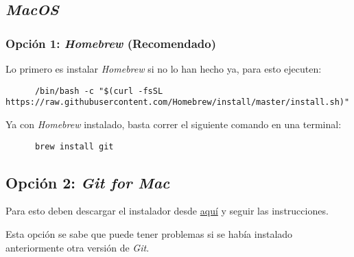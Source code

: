 \subsection{\textit{MacOS}}

  \subsubsection{Opción 1: \textit{Homebrew} (Recomendado)}
    Lo primero es instalar \textit{Homebrew} si no lo han hecho ya, para esto ejecuten:

    \begin{verbatim}
      /bin/bash -c "$(curl -fsSL https://raw.githubusercontent.com/Homebrew/install/master/install.sh)"
    \end{verbatim}

    Ya con \textit{Homebrew} instalado, basta correr el siguiente comando en una terminal:

    \begin{verbatim}
      brew install git
    \end{verbatim}

  \subsection{Opción 2: \textit{Git for Mac}}
    Para esto deben descargar el instalador desde 
    \href{https://sourceforge.net/projects/git-osx-installer/}{aquí} y seguir las 
    instrucciones.

    Esta opción se sabe que puede tener problemas si se había instalado anteriormente otra
    versión de \textit{Git}.
%
